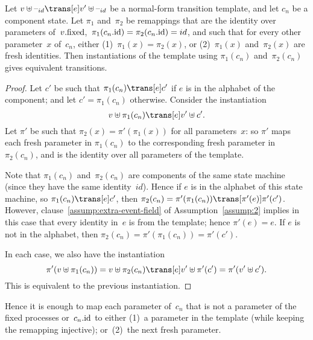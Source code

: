 
\begin{lemma}
Let $v \uplus \hole{id} \trans[e] v' \uplus \hole{id}$ be a normal-form
transition template, and let $c_n$ be a component state.  Let $\pi_1$
and~$\pi_2$ be remappings that are the identity over parameters
of~$v.\mathrm{fixed}$,\, $\pi_1(c_n.\mathrm{id}) = \pi_2(c_n.\mathrm{id}) = id$, and such that for
every other parameter~$x$ of~$c_n$, either (1)~$\pi_1(x) = \pi_2(x)$, or
(2)~$\pi_1(x)$ and~$\pi_2(x)$ are fresh identities.  Then instantiations of
the template using $\pi_1(c_n)$ and~$\pi_2(c_n)$ gives equivalent transitions.
\end{lemma}


\begin{proof}
Let $c'$ be such that $\pi_1(c_n) \trans[e] c'$ if $e$ is in the alphabet of
the component; and let $c' = \pi_1(c_n)$ otherwise.  Consider the instantiation
\[
v \uplus \pi_1(c_n) \trans[e] v' \uplus c'.
\]
Let $\pi'$ be such that $\pi_2(x) = \pi'(\pi_1(x))$ for all parameters~$x$: so
$\pi'$ maps each fresh parameter in $\pi_1(c_n)$ to the corresponding fresh
parameter in~$\pi_2(c_n)$, and is the identity over all parameters of the
template. 

Note that $\pi_1(c_n)$ and~$\pi_2(c_n)$ are components of the same state
machine (since they have the same identity~$id$).  Hence if $e$ is in the
alphabet of this state machine, so $\pi_1(c_n) \trans[e] c'$, then \(
\pi_2(c_n) = \pi'(\pi_1(c_n)) \trans[\pi'(e)] \pi'(c') \).  However,
clause~\ref{assump:extra-event-field} of Assumption~\ref{assump:2} implies in
this case that every identity in~$e$ is from the template; hence $\pi'(e) =
e$.  If $e$ is not in the alphabet, then $\pi_2(c_n) = \pi'(\pi_1(c_n)) =
\pi'(c')$.

In each case, we also have the instantiation
\[
\pi'(v \uplus \pi_1(c_n)) =
v \uplus \pi_2(c_n) \trans[e] v' \uplus \pi'(c') = \pi'(v' \uplus c').
\]
This is equivalent to the previous instantiation. 
\end{proof}


Hence it is enough to map each parameter of~$c_n$ that is not a parameter of
the fixed processes or~$c_n.\mathrm{id}$ to either (1)~a parameter in the template (while
keeping the remapping injective); or~(2)~the next fresh parameter.

